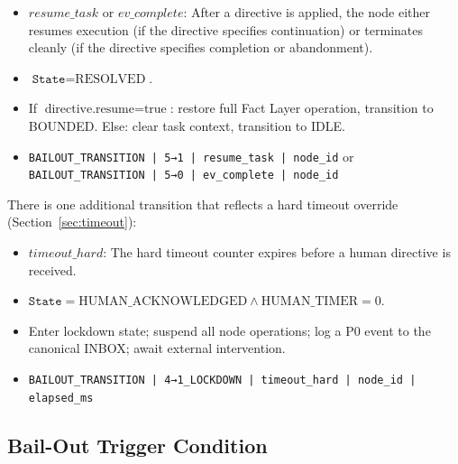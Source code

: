 \begin{definition}
\label{def:trans-resolved}
\begin{itemize}[noitemsep]
    \item[\textbf{Event:}] $resume\_task$ or $ev\_complete$: After a directive is applied, the node either resumes execution (if the directive specifies continuation) or terminates cleanly (if the directive specifies completion or abandonment).
    \item[\textbf{Condition:}] $\texttt{State} = \text{RESOLVED}$.
    \item[\textbf{Action:}] If $\text{directive.resume} = \text{true}$: restore full Fact Layer operation, transition to BOUNDED. Else: clear task context, transition to IDLE.
    \item[\textbf{Log entry:}] \texttt{BAILOUT\_TRANSITION | 5→1 | resume\_task | node\_id} or \texttt{BAILOUT\_TRANSITION | 5→0 | ev\_complete | node\_id}
\end{itemize}
\end{definition}

There is one additional transition that reflects a hard timeout override (Section~\ref{sec:timeout}):

\begin{definition}
\label{def:trans-timeout-override}
\begin{itemize}[noitemsep]
    \item[\textbf{Event:}] $timeout\_hard$: The hard timeout counter expires before a human directive is received.
    \item[\textbf{Condition:}] $\texttt{State} = \text{HUMAN\_ACKNOWLEDGED} \land \text{HUMAN\_TIMER} = 0$.
    \item[\textbf{Action:}] Enter lockdown state; suspend all node operations; log a P0 event to the canonical INBOX; await external intervention.
    \item[\textbf{Log entry:}] \texttt{BAILOUT\_TRANSITION | 4→1\_LOCKDOWN | timeout\_hard | node\_id | elapsed\_ms}
\end{itemize}
\end{definition}

\subsection{Bail-Out Trigger Condition}
\label{sec:bailout-trigger}

